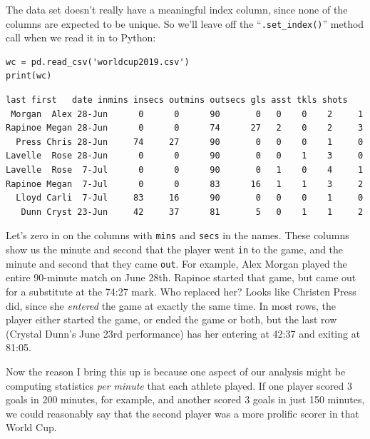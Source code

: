 
The data set doesn't really have a meaningful index column, since none of the
columns are expected to be unique. So we'll leave off the
``\texttt{.set\_index()}'' method call when we read it in to Python:

\begin{samepage}
\begin{Verbatim}[fontsize=\footnotesize,samepage=true,frame=single,framesep=3mm]
wc = pd.read_csv('worldcup2019.csv')
print(wc)
\end{Verbatim}
\vspace{-.2in}

\begin{Verbatim}[fontsize=\CBCodeSmall,samepage=true,frame=leftline,framesep=5mm,framerule=1mm]
   last first   date inmins insecs outmins outsecs gls asst tkls shots
 Morgan  Alex 28-Jun      0      0      90       0   0    0    2     1
Rapinoe Megan 28-Jun      0      0      74      27   2    0    2     3
  Press Chris 28-Jun     74     27      90       0   0    0    1     0
Lavelle  Rose 28-Jun      0      0      90       0   0    1    3     0
Lavelle  Rose  7-Jul      0      0      90       0   1    0    4     1
Rapinoe Megan  7-Jul      0      0      83      16   1    1    3     2
  Lloyd Carli  7-Jul     83     16      90       0   0    0    1     0
   Dunn Cryst 23-Jun     42     37      81       5   0    1    1     2
\end{Verbatim}
\end{samepage}


Let's zero in on the columns with \texttt{mins} and \texttt{secs} in the names.
These columns show us the minute and second that the player went \texttt{in} to
the game, and the minute and second that they came \texttt{out}. For example,
Alex Morgan played the entire 90-minute match on June 28th. Rapinoe started
that game, but came out for a substitute at the 74:27 mark. Who replaced her?
Looks like Christen Press did, since she \textit{entered} the game at exactly
the same time. In most rows, the player either started the game, or ended the
game or both, but the last row (Crystal Dunn's June 23rd performance) has her
entering at 42:37 and exiting at 81:05.

Now the reason I bring this up is because one aspect of our analysis might be
computing statistics \textit{per minute} that each athlete played. If one
player scored 3 goals in 200 minutes, for example, and another scored 3 goals
in just 150 minutes, we could reasonably say that the second player was a more
prolific scorer in that World Cup.

